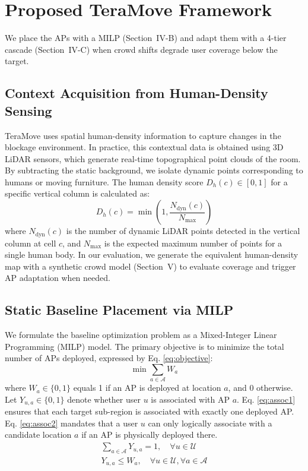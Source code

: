 \documentclass[conference]{IEEEtran}
\begin{document}
	\section{Proposed TeraMove Framework}

	We place the APs with a MILP (Section~IV-B) and adapt them with a 4-tier cascade (Section~IV-C) when crowd shifts degrade user coverage below the target.

	\subsection{Context Acquisition from Human-Density Sensing}

	TeraMove uses spatial human-density information to capture changes in the blockage environment. In practice, this contextual data is obtained using 3D LiDAR sensors, which generate real-time topographical point clouds of the room. By subtracting the static background, we isolate dynamic points corresponding to humans or moving furniture. The human density score $D_h(c) \in [0,1]$ for a specific vertical column is calculated as:
	\begin{equation}
		D_h(c) = \min \left(1, \frac{N_{\text{dyn}}(c)}{N_{\text{max}}} \right)
	\end{equation}
	where $N_{\text{dyn}}(c)$ is the number of dynamic LiDAR points detected in the vertical column at cell $c$, and $N_{\text{max}}$ is the expected maximum number of points for a single human body. In our evaluation, we generate the equivalent human-density map with a synthetic crowd model (Section~V) to evaluate coverage and trigger AP adaptation when needed.

	\subsection{Static Baseline Placement via MILP}

	We formulate the baseline optimization problem as a Mixed-Integer Linear Programming (MILP) model. The primary objective is to minimize the total number of APs deployed, expressed by Eq. \eqref{eq:objective}:
	\begin{equation}
		\min \sum_{a \in \mathcal{A}} W_a
		\label{eq:objective}
	\end{equation}
	where $W_a \in \{0,1\}$ equals 1 if an AP is deployed at location $a$, and 0 otherwise. Let $Y_{u,a} \in \{0,1\}$ denote whether user $u$ is associated with AP $a$. Eq. \eqref{eq:assoc1} ensures that each target sub-region is associated with exactly one deployed AP. Eq. \eqref{eq:assoc2} mandates that a user $u$ can only logically associate with a candidate location $a$ if an AP is physically deployed there.
	\begin{gather}
		\sum_{a \in \mathcal{A}} Y_{u,a} = 1, \quad \forall u \in \mathcal{U}
		\label{eq:assoc1} \\
		Y_{u,a} \le W_a, \quad \forall u \in \mathcal{U}, \forall a \in \mathcal{A}
		\label{eq:assoc2}
	\end{gather}
\end{document}
